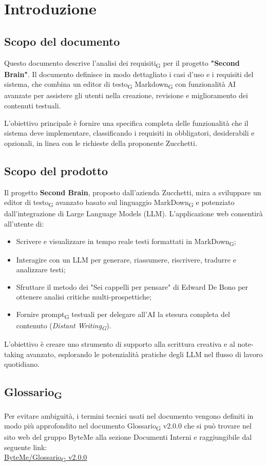 \documentclass[11pt,a4paper]{article}
\newcommand{\gls}[1]{#1\textsubscript{G}}
\begin{document}
\setcounter{page}{1}

\section{Introduzione}
\subsection{Scopo del documento}
Questo documento descrive l'\gls{analisi dei requisiti} per il progetto \textbf{"Second Brain"}. Il documento definisce in modo dettagliato i casi d'uso e i requisiti del sistema, che combina un \gls{editor di testo} \gls{Markdown} con funzionalità AI avanzate per assistere gli utenti nella creazione, revisione e miglioramento dei contenuti testuali.

L'obiettivo principale è fornire una specifica completa delle funzionalità che il sistema deve implementare, classificando i requisiti in obbligatori, desiderabili e opzionali, in linea con le richieste della proponente Zucchetti.

\subsection{Scopo del prodotto}
Il progetto \textbf{Second Brain}, proposto dall'azienda Zucchetti, mira a sviluppare un \gls{editor di testo} avanzato basato sul linguaggio \gls{MarkDown} e potenziato dall'integrazione di Large Language Models (LLM).
L'applicazione web consentirà all'utente di:
\begin{itemize}
    \item Scrivere e visualizzare in tempo reale testi formattati in \gls{MarkDown};
    \item Interagire con un LLM per generare, riassumere, riscrivere, tradurre e analizzare testi;
    \item Sfruttare il metodo dei "Sei cappelli per pensare" di Edward De Bono per ottenere analisi critiche multi-prospettiche;
    \item Fornire \gls{prompt} testuali per delegare all'AI la stesura completa del contenuto (\textit{\gls{Distant Writing}}).
\end{itemize}
L'obiettivo è creare uno strumento di supporto alla scrittura creativa e al note-taking avanzato, esplorando le potenzialità pratiche degli LLM nel flusso di lavoro quotidiano.

\subsection{\gls{Glossario}}
Per evitare ambiguità, i termini tecnici usati nel documento vengono definiti in modo più approfondito nel documento \gls{Glossario} v2.0.0 che si può trovare nel sito web del gruppo ByteMe alla sezione Documenti Interni e raggiungibile dal seguente link:\\
\href{https://byteme25.github.io/ByteMe/files.html}{ByteMe/\gls{Glossario} v2.0.0}
\end{document}
